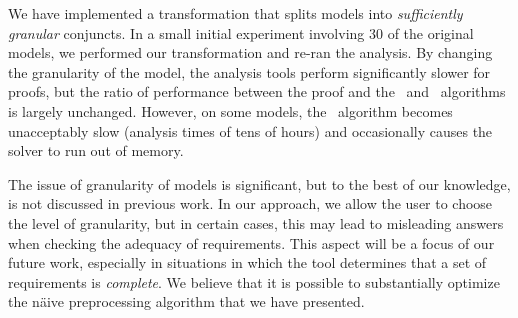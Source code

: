We have implemented a transformation that splits models into {\em sufficiently granular} conjuncts.  In a small initial experiment involving 30 of the original models, we performed our transformation and re-ran the analysis.  By changing the granularity of the model, the analysis tools perform significantly slower for proofs, but the ratio of performance between the proof and the \ucalg\ and \mustalg\ algorithms is largely unchanged.  However, on some models, the \mustalg\ algorithm becomes unacceptably slow (analysis times of tens of hours) and occasionally causes the solver to run out of memory.

The issue of granularity of models is significant, but to the best of our knowledge, is not discussed in previous work.  In our approach, we allow the user to choose the level of granularity, but in certain cases, this may lead to misleading answers when checking the adequacy of requirements.  This aspect will be a focus of our future work, especially in situations in which the tool determines that a set of requirements is {\em complete}.  We believe that it is possible to substantially optimize the n{\"a}ive preprocessing algorithm that we have presented.

